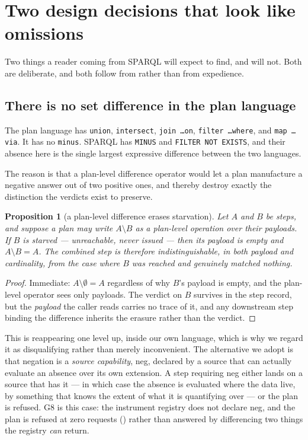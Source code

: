 \documentclass[11pt,a4paper]{article}
\theoremstyle{plain}
\newtheorem{proposition}[theorem]{Proposition}
\theoremstyle{definition}
\theoremstyle{remark}
\newcommand{\vstarve}{\textsf{starved}}
\begin{document}
\section{Two design decisions that look like omissions}
\label{sec:omissions}

Two things a reader coming from SPARQL will expect to find, and will
not. Both are deliberate, and both follow from  rather
than from expedience.

\subsection{There is no set difference in the plan language}
\label{sec:nominus}

The plan language has \texttt{union}, \texttt{intersect}, \texttt{join
\ldots on}, \texttt{filter \ldots where}, and \texttt{map \ldots via}.
It has no \texttt{minus}. SPARQL has \texttt{MINUS} and \texttt{FILTER
NOT EXISTS}, and their absence here is the single largest expressive
difference between the two languages.

The reason is that a plan-level difference operator would let a plan
manufacture a negative answer out of two positive ones, and thereby
destroy exactly the distinction the verdicts exist to preserve.

\begin{proposition}[a plan-level difference erases starvation]
\label{prop:nominus}
Let $A$ and $B$ be steps, and suppose a plan may write $A \setminus B$
as a plan-level operation over their payloads. If $B$ is \vstarve{} ---
unreachable, never issued --- then its payload is empty and $A
\setminus B = A$. The combined step is therefore indistinguishable, in
both payload and cardinality, from the case where $B$ was reached and
genuinely matched nothing.
\end{proposition}

\begin{proof}
Immediate: $A \setminus \emptyset = A$ regardless of why $B$'s payload
is empty, and the plan-level operator sees only payloads. The verdict on
$B$ survives in the step record, but the \emph{payload} the caller reads
carries no trace of it, and any downstream step binding the difference
inherits the erasure rather than the verdict.
\end{proof}

This is  reappearing one level up, inside our own
language, which is why we regard it as disqualifying rather than merely
inconvenient. The alternative we adopt is that negation is a
\emph{source capability}, \textsf{neg}, declared by a source that can
actually evaluate an absence over its own extension. A step requiring
\textsf{neg} either lands on a source that has it --- in which case the
absence is evaluated where the data live, by something that knows the
extent of what it is quantifying over --- or the plan is refused. G8 is
this case: the instrument registry does not declare \textsf{neg}, and
the plan is refused at zero requests () rather than
answered by differencing two things the registry \emph{can} return.
\end{document}
